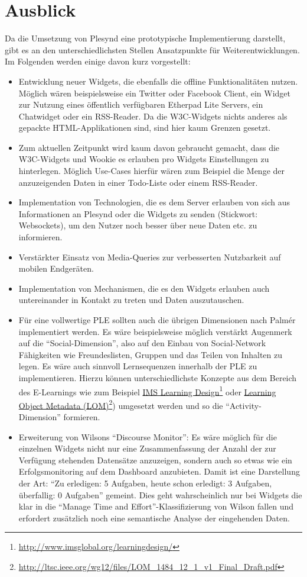 \section{Ausblick}
Da die Umsetzung von Plesynd eine prototypische Implementierung darstellt, gibt es an den unterschiedlichsten Stellen Ansatzpunkte für Weiterentwicklungen. Im Folgenden werden einige davon kurz vorgestellt:

\begin{itemize}
 \item Entwicklung neuer Widgets, die ebenfalls die offline Funktionalitäten nutzen. Möglich wären beispielsweise ein Twitter oder Facebook Client, ein Widget zur Nutzung eines öffentlich verfügbaren Etherpad Lite Servers, ein Chatwidget oder ein RSS-Reader. Da die W3C-Widgets nichts anderes als gepackte HTML-Applikationen sind, sind hier kaum Grenzen gesetzt.
 \item Zum aktuellen Zeitpunkt wird kaum davon gebraucht gemacht, dass die W3C-Widgets und Wookie es erlauben pro Widgets Einstellungen zu hinterlegen. Möglich Use-Cases hierfür wären zum Beispiel die Menge der anzuzeigenden Daten in einer Todo-Liste oder einem RSS-Reader.
 \item Implementation von Technologien, die es dem Server erlauben von sich aus Informationen an Plesynd oder die Widgets zu senden (Stickwort: Websockets), um den Nutzer noch besser über neue Daten etc. zu informieren.
 \item Verstärkter Einsatz von Media-Queries zur verbesserten Nutzbarkeit auf mobilen Endgeräten.
 \item Implementation von Mechanismen, die es den Widgets erlauben auch untereinander in Kontakt zu treten und Daten auszutauschen.
 \item Für eine vollwertige PLE sollten auch die übrigen Dimensionen nach Palmér implementiert werden. Es wäre beispielsweise möglich verstärkt Augenmerk auf die "`Social-Dimension"', also auf den Einbau von Social-Network Fähigkeiten wie Freundeslisten, Gruppen und das Teilen von Inhalten zu legen. Es wäre auch sinnvoll Lernsequenzen innerhalb der PLE zu implementieren. Hierzu können unterschiedlichste Konzepte aus dem Bereich des E-Learnings wie zum Beispiel \href{http://www.imsglobal.org/learningdesign/}{IMS Learning Design}\footnote{\url{http://www.imsglobal.org/learningdesign/}} oder \href{http://ltsc.ieee.org/wg12/files/LOM_1484_12_1_v1_Final_Draft.pdf}{Learning Object Metadata (LOM)}\footnote{\url{http://ltsc.ieee.org/wg12/files/LOM_1484_12_1_v1_Final_Draft.pdf}}) umgesetzt werden und so die "`Activity-Dimension"' formieren.
 \item Erweiterung von Wilsons "`Discourse Monitor"': Es wäre möglich für die einzelnen Widgets nicht nur eine Zusammenfassung der Anzahl der zur Verfügung stehenden Datensätze anzuzeigen, sondern auch so etwas wie ein Erfolgsmonitoring auf dem Dashboard anzubieten. Damit ist eine Darstellung der Art: "`Zu erledigen: 5 Aufgaben, heute schon erledigt: 3 Aufgaben, überfallig: 0 Aufgaben"' gemeint. Dies geht wahrscheinlich nur bei Widgets die klar in die “Manage Time and Effort”-Klassifizierung von Wilson fallen und erfordert zusätzlich noch eine semantische Analyse der eingehenden Daten.
\end{itemize}




